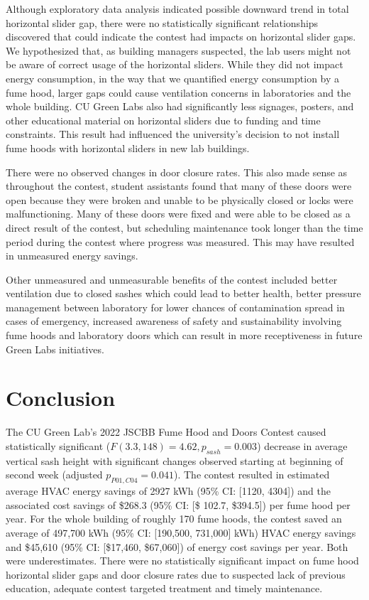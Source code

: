 \documentclass[12pt, twocolumn]{article}
\begin{document}
Although exploratory data analysis indicated possible downward trend in total horizontal slider gap, there were no statistically significant relationships discovered that could indicate the contest had impacts on horizontal slider gaps. We hypothesized that, as building managers suspected, the lab users might not be aware of correct usage of the horizontal sliders. While they did not impact energy consumption, in the way that we quantified energy consumption by a fume hood, larger gaps could cause ventilation concerns in laboratories and the whole building. CU Green Labs also had significantly less signages, posters, and other educational material on horizontal sliders due to funding and time constraints. This result had influenced the university's decision to not install fume hoods with horizontal sliders in new lab buildings. 

There were no observed changes in door closure rates. This also made sense as throughout the contest, student assistants found that many of these doors were open because they were broken and unable to be physically closed or locks were malfunctioning. Many of these doors were fixed and were able to be closed as a direct result of the contest, but scheduling maintenance took longer than the time period during the contest where progress was measured. This may have resulted in unmeasured energy savings. 

Other unmeasured and unmeasurable benefits of the contest included better ventilation due to closed sashes which could lead to better health, better pressure management between laboratory for lower chances of contamination spread in cases of emergency, increased awareness of safety and sustainability involving fume hoods and laboratory doors which can result in more receptiveness in future Green Labs initiatives. 

\section*{Conclusion}
The CU Green Lab's 2022 JSCBB Fume Hood and Doors Contest caused statistically significant ($F(3.3, 148) = 4.62, p_{sash} = 0.003$) decrease in average vertical sash height with significant changes observed starting at beginning of second week (adjusted $p_{P01,C04} = 0.041$). The contest resulted in estimated average HVAC energy savings of 2927 kWh (95\% CI: [1120, 4304]) and the associated cost savings of \$268.3 (95\% CI: [\$ 102.7, \$394.5]) per fume hood per year. For the whole building of roughly 170 fume hoods, the contest saved an average of 497,700 kWh (95\% CI: [190,500, 731,000] kWh) HVAC energy savings and \$45,610 (95\% CI: [\$17,460, \$67,060]) of energy cost savings per year. Both were underestimates. There were no statistically significant impact on fume hood horizontal slider gaps and door closure rates due to suspected lack of previous education, adequate contest targeted treatment and timely maintenance. 
\end{document}
